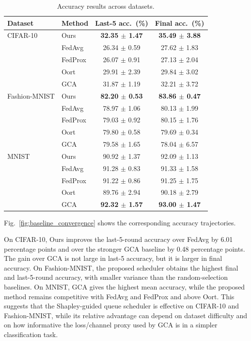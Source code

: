 \documentclass[journal]{IEEEtran}
\begin{document}
\begin{table}[t]
\centering
\caption{Accuracy results across datasets.}
\label{tab:main}
\scriptsize
\setlength{\tabcolsep}{2.2pt}
\begin{tabular}{l|l|c|c}
\hline
\textbf{Dataset} & \textbf{Method} & \textbf{Last-5 acc.\ (\%)} & \textbf{Final acc.\ (\%)} \\
\hline
CIFAR-10 & Ours    & \textbf{32.35 $\pm$ 1.47} & \textbf{35.49 $\pm$ 3.88} \\
         & FedAvg  & 26.34 $\pm$ 0.59          & 27.62 $\pm$ 1.83 \\
         & FedProx & 26.07 $\pm$ 0.91          & 27.13 $\pm$ 2.04 \\
         & Oort    & 29.91 $\pm$ 2.39          & 29.84 $\pm$ 3.02 \\
         & GCA     & 31.87 $\pm$ 1.19          & 32.21 $\pm$ 3.72 \\
\hline
Fashion-MNIST & Ours    & \textbf{82.20 $\pm$ 0.53} & \textbf{83.86 $\pm$ 0.47} \\
              & FedAvg  & 78.97 $\pm$ 1.06 & 80.13 $\pm$ 1.99 \\
              & FedProx & 79.03 $\pm$ 0.92 & 80.15 $\pm$ 1.76 \\
              & Oort    & 79.80 $\pm$ 0.58 & 79.69 $\pm$ 0.34 \\
              & GCA     & 79.58 $\pm$ 1.65 & 78.04 $\pm$ 6.57 \\
\hline
MNIST    & Ours    & 90.92 $\pm$ 1.37 & 92.09 $\pm$ 1.13 \\
         & FedAvg  & 91.28 $\pm$ 0.83 & 91.33 $\pm$ 1.58 \\
         & FedProx & 91.22 $\pm$ 0.86 & 91.25 $\pm$ 1.75 \\
         & Oort    & 89.76 $\pm$ 2.94 & 90.18 $\pm$ 2.79 \\
         & GCA     & \textbf{92.32 $\pm$ 1.57} & \textbf{93.00 $\pm$ 1.47} \\
\hline
\end{tabular}
\end{table}

Fig.~\ref{fig:baseline_convergence} shows the corresponding accuracy trajectories.

On CIFAR-10, Ours improves the last-5-round accuracy over FedAvg by 6.01 percentage points and over the stronger GCA baseline by 0.48 percentage points. The gain over GCA is not large in last-5 accuracy, but it is larger in final accuracy. On Fashion-MNIST, the proposed scheduler obtains the highest final and last-5-round accuracy, with smaller variance than the random-selection baselines. On MNIST, GCA gives the highest mean accuracy, while the proposed method remains competitive with FedAvg and FedProx and above Oort. This suggests that the Shapley-guided queue scheduler is effective on CIFAR-10 and Fashion-MNIST, while its relative advantage can depend on dataset difficulty and on how informative the loss/channel proxy used by GCA is in a simpler classification task.
\end{document}
